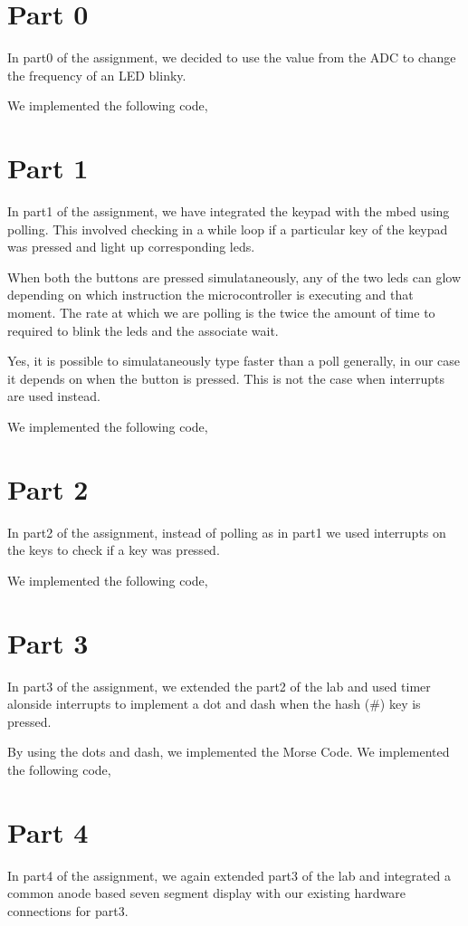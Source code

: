 \documentclass[a4paper]{article}
\begin{document}
\section*{Part 0}
In part0 of the assignment, we decided to use the value from the ADC to change the frequency of an LED blinky. 

We implemented the following code, 


\section*{Part 1}
In part1 of the assignment, we have integrated the keypad with the mbed using polling. This involved checking in a while loop if a particular key of the keypad was pressed and light up corresponding leds.

When both the buttons are pressed simulataneously, any of the two leds 
can glow depending on which instruction the microcontroller is 
executing and that moment. The rate at which we are polling is the 
twice the amount of time to required to blink the leds and the associate wait. 

Yes, it is possible to simulataneously type faster than a poll 
generally, in our case it depends on when the button is pressed. This 
is not the case when interrupts are used instead.

We implemented the following code, 


\section*{Part 2}
In part2 of the assignment, instead of polling as in part1 we used interrupts on the keys to check if a key was pressed. 

We implemented the following code, 


\section*{Part 3}
In part3 of the assignment, we extended the part2 of the lab and used 
timer alonside interrupts to implement a dot and dash when the hash 
(\#) key is pressed. 

By using the dots and dash, we implemented the Morse Code.
We implemented the following code, 


\section*{Part 4}
In part4 of the assignment,  we again extended part3  of the lab and integrated a common anode based seven segment display with our existing hardware connections for part3.
\end{document}
